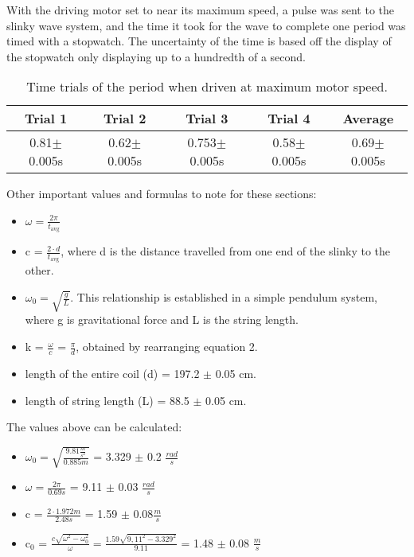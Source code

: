 \documentclass[12pt, letterpaper, twoside]{article}
\begin{document}
With the driving motor set to near its maximum speed, a pulse was sent to the slinky wave system, and the time it took for the wave to complete one period was timed with a stopwatch. The uncertainty of the time is based off the display of the stopwatch only displaying up to a hundredth of a second.

\begin{table}[!ht]
    \centering
        \begin{tabular}{|c|c|c|c|c|}
            \hline
            Trial 1 & Trial 2 & Trial 3 & Trial 4 & Average\\
            \hline
            0.81$\pm$0.005s& 0.62$\pm$0.005s & 0.753$\pm$0.005s & 0.58$\pm$0.005s & 0.69$\pm$0.005s \\
            \hline
        \end{tabular}
    \caption{Time trials of the period when driven at maximum motor speed.}
    \label{tab:my_label}
\end{table}


Other important values and formulas to note for these sections:

\begin{itemize}
    \item $\omega = \frac{2\pi}{t_{\text{avg}}}$
    \item c = $\frac{2\cdot d}{t_{\text{avg}}}$, where d is the distance travelled from one end of the slinky to the other.
    \item $\omega_0 = \sqrt{\frac{g}{L}}$. This relationship is established in a simple pendulum system, where g is gravitational force and L is the string length.
    \item k = $\frac{\omega}{c}$ = $\frac{\pi}{d}$, obtained by rearranging equation 2.
    \item length of the entire coil (d) = 197.2 $\pm$ 0.05 cm.
    \item length of string length (L) = 88.5 $\pm$ 0.05 cm.
\end{itemize}

The values above can be calculated:

\begin{itemize}
    \item $\omega_0 = \sqrt{\frac{9.81 \frac{m}{s^2}}{0.885 m}}$  = 3.329 $\pm$ 0.2 $\frac{rad}{s}$
    \item $\omega = \frac{2\pi}{0.69 s}$ = 9.11 $\pm$ 0.03 $\frac{rad}{s}$
    \item c = $\frac{2\cdot 1.972 m}{2.48 s}$ = 1.59 $\pm$ 0.08$\frac{m}{s}$
    \item c$_0$ = $\frac{c\sqrt{\omega^2 - \omega_0^2}}{\omega} = \frac{1.59\sqrt{9,11^2 - 3.329^2}}{9.11}$ = 1.48 $\pm$ 0.08 $\frac{m}{s}$
\end{itemize}
\end{document}
